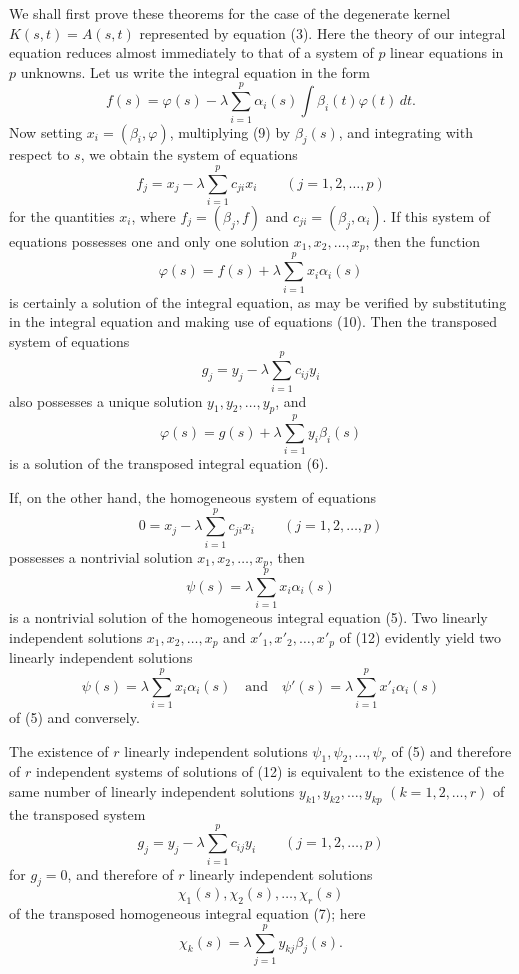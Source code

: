 We shall first prove these theorems for the case of the degenerate kernel $K(s,t)=A(s,t)$ represented by equation (3). Here the theory of our integral equation reduces almost immediately to that of a system of $p$ linear equations in $p$ unknowns. Let us write the integral equation in the form
\begin{equation}\tag{9}
f(s)=\varphi(s)-\lambda\sum_{i=1}^{p}\alpha_i(s)\int\beta_i(t)\varphi(t)\,dt.
\end{equation}
Now setting $x_i=(\beta_i,\varphi)$, multiplying (9) by $\beta_j(s)$, and integrating with respect to $s$, we obtain the system of equations
\begin{equation}\tag{10}
f_j=x_j-\lambda\sum_{i=1}^{p}c_{ji}x_i
\qquad (j=1,2,\ldots,p)
\end{equation}
for the quantities $x_i$, where $f_j=(\beta_j,f)$ and $c_{ji}=(\beta_j,\alpha_i)$. If this system of equations possesses one and only one solution $x_1,x_2,\ldots,x_p$, then the function
\[
\varphi(s)=f(s)+\lambda\sum_{i=1}^{p}x_i\alpha_i(s)
\]
is certainly a solution of the integral equation, as may be verified by substituting in the integral equation and making use of equations (10). Then the transposed system of equations
\begin{equation}\tag{11}
g_j=y_j-\lambda\sum_{i=1}^{p}c_{ij}y_i
\end{equation}
also possesses a unique solution $y_1,y_2,\ldots,y_p$, and
\[
\varphi(s)=g(s)+\lambda\sum_{i=1}^{p}y_i\beta_i(s)
\]
is a solution of the transposed integral equation (6).

If, on the other hand, the homogeneous system of equations
\begin{equation}\tag{12}
0=x_j-\lambda\sum_{i=1}^{p}c_{ji}x_i
\qquad (j=1,2,\ldots,p)
\end{equation}
possesses a nontrivial solution $x_1,x_2,\ldots,x_p$, then
\[
\psi(s)=\lambda\sum_{i=1}^{p}x_i\alpha_i(s)
\]
is a nontrivial solution of the homogeneous integral equation (5). Two linearly independent solutions $x_1,x_2,\ldots,x_p$ and $x'_1,x'_2,\ldots,x'_p$ of (12) evidently yield two linearly independent solutions
\[
\psi(s)=\lambda\sum_{i=1}^{p}x_i\alpha_i(s)
\quad\text{and}\quad
\psi'(s)=\lambda\sum_{i=1}^{p}x'_i\alpha_i(s)
\]
of (5) and conversely.

The existence of $r$ linearly independent solutions $\psi_1,\psi_2,\ldots,\psi_r$ of (5) and therefore of $r$ independent systems of solutions of (12) is equivalent to the existence of the same number of linearly independent solutions $y_{k1},y_{k2},\ldots,y_{kp}$ $(k=1,2,\ldots,r)$ of the transposed system
\begin{equation}\tag{13}
g_j=y_j-\lambda\sum_{i=1}^{p}c_{ij}y_i
\qquad (j=1,2,\ldots,p)
\end{equation}
for $g_j=0$, and therefore of $r$ linearly independent solutions
\[
\chi_1(s),\chi_2(s),\ldots,\chi_r(s)
\]
of the transposed homogeneous integral equation (7); here
\begin{equation}\tag{14}
\chi_k(s)=\lambda\sum_{j=1}^{p}y_{kj}\beta_j(s).
\end{equation}

